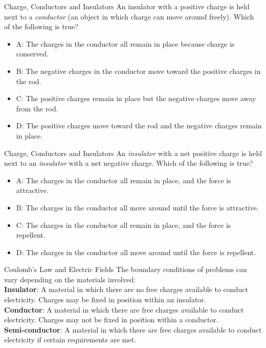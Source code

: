 \documentclass{beamer}
\begin{document}
\begin{frame}{Charge, Conductors and Insulators}
An insulator with a positive charge is held next to a \textit{conductor} (an object in which charge can move around freely).  Which of the following is true?
\begin{itemize}
\item A: The charges in the conductor all remain in place because charge is conserved.
\item B: The negative charges in the conductor move toward the positive charges in the rod.
\item C: The positive charges remain in place but the negative charges move away from the rod.
\item D: The positive charges move toward the rod and the negative charges remain in place.
\end{itemize}
\end{frame}

\begin{frame}{Charge, Conductors and Insulators}
An \textit{insulator} with a net positive charge is held next to an \textit{insulator} with a net negative charge.  Which of the following is true?
\begin{itemize}
\item A: The charges in the conductor all remain in place, and the force is attractive.
\item B: The charges in the conductor all move around until the force is attractive.
\item C: The charges in the conductor all remain in place, and the force is repellent.
\item D: The charges in the conductor all move around until the force is repellent.
\end{itemize}
\end{frame}

\begin{frame}{Coulomb’s Law and Electric Fields}
The boundary conditions of problems can vary depending on the materials involved: \\ \vspace{0.5cm}
\textbf{Insulator}: A material in which there are no free charges available to conduct electricity.  Charges may be fixed in position within an insulator. \\
\textbf{Conductor}: A material in which there are free charges available to conduct electricity.  Charges may not be fixed in position within a conductor. \\
\textbf{Semi-conductor}: A material in which there are free charges available to conduct electricity if certain requirements are met.
\end{frame}
\end{document}

